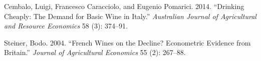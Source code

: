 \documentclass[11pt,]{article}
\begin{document}
\hypertarget{refs}{}
\leavevmode\hypertarget{ref-cembalo2014}{}%
Cembalo, Luigi, Francesco Caracciolo, and Eugenio Pomarici. 2014.
``Drinking Cheaply: The Demand for Basic Wine in Italy.''
\emph{Australian Journal of Agricultural and Resource Economics} 58 (3):
374--91.

\leavevmode\hypertarget{ref-steiner2004}{}%
Steiner, Bodo. 2004. ``French Wines on the Decline? Econometric Evidence
from Britain.'' \emph{Journal of Agricultural Economics} 55 (2):
267--88.
\end{document}
